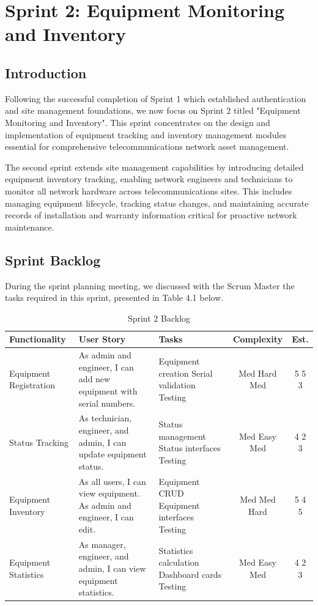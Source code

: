\newpage

\chapter{Sprint 2: Equipment Monitoring and Inventory}

\cfoot{\thepage}

\parindent=0.5in
\onehalfspacing

\section{Introduction}

Following the successful completion of Sprint 1 which established authentication and site management foundations, we now focus on Sprint 2 titled "Equipment Monitoring and Inventory". This sprint concentrates on the design and implementation of equipment tracking and inventory management modules essential for comprehensive telecommunications network asset management.

The second sprint extends site management capabilities by introducing detailed equipment inventory tracking, enabling network engineers and technicians to monitor all network hardware across telecommunications sites. This includes managing equipment lifecycle, tracking status changes, and maintaining accurate records of installation and warranty information critical for proactive network maintenance.

\section{Sprint Backlog}

During the sprint planning meeting, we discussed with the Scrum Master the tasks required in this sprint, presented in Table 4.1 below.

\begin{table}[H]
\centering
\small
\begin{tabular}{|p{2.5cm}|p{4cm}|p{2.8cm}|c|c|}
\hline
\textbf{Functionality} & \textbf{User Story} & \textbf{Tasks} & \textbf{Complexity} & \textbf{Est.} \\
\hline
Equipment Registration & 
As admin and engineer, I can add new equipment with serial numbers.
& 
Equipment creation
Serial validation
Testing
& 
Med
Hard  
Med
& 
5
5
3 \\
\hline
Status Tracking & 
As technician, engineer, and admin, I can update equipment status.
& 
Status management
Status interfaces
Testing
& 
Med
Easy
Med
& 
4
2
3 \\
\hline
Equipment Inventory & 
As all users, I can view equipment. As admin and engineer, I can edit.
& 
Equipment CRUD
Equipment interfaces
Testing
& 
Med
Med
Hard
& 
5
4
5 \\
\hline
Equipment Statistics & 
As manager, engineer, and admin, I can view equipment statistics.
& 
Statistics calculation
Dashboard cards
Testing
& 
Med
Easy
Med
& 
4
2
3 \\
\hline
\end{tabular}
\caption{Sprint 2 Backlog}
\label{tab:sprint2_backlog}
\end{table}

